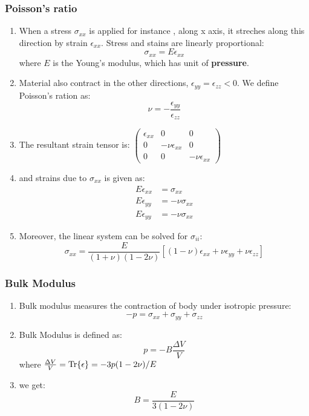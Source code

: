 \documentclass[12pt,a4paper]{article}
\begin{document}
    \subsubsection{Poisson's ratio} 
        \begin{enumerate}
            \item When a stress $\sigma_{xx}$ is applied for instance , along x axis, it streches along this direction by strain $\epsilon_{xx}$. Stress and stains are linearly proportional:
            $$
                \sigma_{xx} = E \epsilon_{xx}
            $$
            where $E$ is the Young's modulus, which has unit of \textbf{pressure}.
            \item Material also contract in the other directions, $\epsilon_{yy} = \epsilon_{zz} < 0$. We define Poisson's ration as:
            $$
                \nu = -\dfrac{\epsilon_{yy}}{\epsilon_{zz}}
            $$
            \item The resultant strain tensor is:
            $\begin{pmatrix}
                \epsilon_{xx} & 0 & 0\\
                0 & -\nu \epsilon_{xx} & 0\\
                0 & 0 & -\nu \epsilon_{xx}
            \end{pmatrix}$
            \item and strains due to $\sigma_{xx}$ is given as:
                \begin{align}
                    E\epsilon_{xx}  &= \sigma_{xx}\\
                    E\epsilon_{yy}  &= -\nu \sigma_{xx}\\
                    E\epsilon_{yy}  &= -\nu \sigma_{xx}
                \end{align}
            \item Moreover, the linear system can be solved for $\sigma_{ii}$:
            $$
                \sigma_{xx}= \frac{E}{(1+\nu)(1-2\nu)}[(1-\nu)\epsilon_{xx}+\nu \epsilon_{yy}+ \nu\epsilon_{zz}]
            $$
        \end{enumerate}
    \subsubsection{Bulk Modulus}
        \begin{enumerate}
            \item Bulk modulus measures the contraction of body under isotropic pressure:
            $$
                -p= \sigma_{xx}+\sigma_{yy}+\sigma_{zz}
            $$
            \item Bulk Modulus is defined as:
            $$
                p=-B\frac{\Delta V}{V} 
            $$
            where $\frac{\Delta V}{V} = \Tr{\epsilon}=-3p(1-2\nu)/E$
            \item we get:
            $$
                B = \frac{E}{3(1-2\nu)}
            $$
        \end{enumerate}
\end{document}
